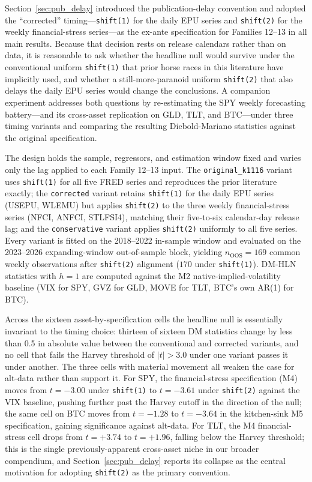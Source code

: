 \documentclass[12pt,a4paper]{article}
\begin{document}
Section~\ref{sec:pub_delay} introduced the publication-delay convention and adopted the ``corrected'' timing---\texttt{shift(1)} for the daily EPU series and \texttt{shift(2)} for the weekly financial-stress series---as the ex-ante specification for Families 12--13 in all main results. Because that decision rests on release calendars rather than on data, it is reasonable to ask whether the headline null would survive under the conventional uniform \texttt{shift(1)} that prior horse races in this literature have implicitly used, and whether a still-more-paranoid uniform \texttt{shift(2)} that also delays the daily EPU series would change the conclusions. A companion experiment addresses both questions by re-estimating the SPY weekly forecasting battery---and its cross-asset replication on GLD, TLT, and BTC---under three timing variants and comparing the resulting Diebold-Mariano statistics against the original specification.

The design holds the sample, regressors, and estimation window fixed and varies only the lag applied to each Family 12--13 input. The \texttt{original\_k1116} variant uses \texttt{shift(1)} for all five FRED series and reproduces the prior literature exactly; the \texttt{corrected} variant retains \texttt{shift(1)} for the daily EPU series (USEPU, WLEMU) but applies \texttt{shift(2)} to the three weekly financial-stress series (NFCI, ANFCI, STLFSI4), matching their five-to-six calendar-day release lag; and the \texttt{conservative} variant applies \texttt{shift(2)} uniformly to all five series. Every variant is fitted on the 2018--2022 in-sample window and evaluated on the 2023--2026 expanding-window out-of-sample block, yielding $n_{\text{OOS}} = 169$ common weekly observations after \texttt{shift(2)} alignment ($170$ under \texttt{shift(1)}). DM-HLN statistics \citep{diebold1995} with $h=1$ are computed against the M2 native-implied-volatility baseline (VIX for SPY, GVZ for GLD, MOVE for TLT, BTC's own AR(1) for BTC).

Across the sixteen asset-by-specification cells the headline null is essentially invariant to the timing choice: thirteen of sixteen DM statistics change by less than 0.5 in absolute value between the conventional and corrected variants, and no cell that fails the Harvey threshold of $|t|>3.0$ under one variant passes it under another. The three cells with material movement all weaken the case for alt-data rather than support it. For SPY, the financial-stress specification (M4) moves from $t=-3.00$ under \texttt{shift(1)} to $t=-3.61$ under \texttt{shift(2)} against the VIX baseline, pushing further past the Harvey cutoff in the direction of the null; the same cell on BTC moves from $t=-1.28$ to $t=-3.64$ in the kitchen-sink M5 specification, gaining significance against alt-data. For TLT, the M4 financial-stress cell drops from $t=+3.74$ to $t=+1.96$, falling below the Harvey threshold; this is the single previously-apparent cross-asset niche in our broader compendium, and Section~\ref{sec:pub_delay} reports its collapse as the central motivation for adopting \texttt{shift(2)} as the primary convention.
\end{document}
